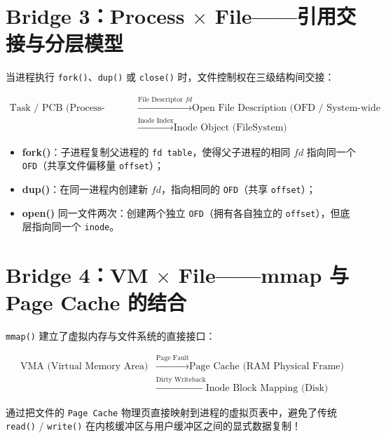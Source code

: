 \documentclass[11pt,a4paper]{ctexart}
\newcommand{\kw}[1]{\textbf{#1}}
\newcommand{\code}[1]{\texttt{#1}}
\begin{document}
\section{Bridge 3：Process $\times$ File——引用交接与分层模型}

当进程执行 \code{fork()}、\code{dup()} 或 \code{close()} 时，文件控制权在三级结构间交接：

\[
\boxed{
\begin{aligned}
\text{Task / PCB (Process-private Table)}
&\xrightarrow{\text{File Descriptor } fd} \text{Open File Description (OFD / System-wide Table)} \\
&\xrightarrow{\text{Inode Index}} \text{Inode Object (FileSystem)}
\end{aligned}
}
\]

\begin{itemize}
  \item \kw{fork()}：子进程复制父进程的 \code{fd table}，使得父子进程的相同 $fd$ 指向同一个 \code{OFD}（共享文件偏移量 \code{offset}）；
  \item \kw{dup()}：在同一进程内创建新 $fd$，指向相同的 \code{OFD}（共享 \code{offset}）；
  \item \kw{open()} 同一文件两次：创建两个独立 \code{OFD}（拥有各自独立的 \code{offset}），但底层指向同一个 \code{inode}。
\end{itemize}

\section{Bridge 4：VM $\times$ File——mmap 与 Page Cache 的结合}

\code{mmap()} 建立了虚拟内存与文件系统的直接接口：

\[
\boxed{
\begin{aligned}
\text{VMA (Virtual Memory Area)}
&\xrightarrow{\text{Page Fault}} \text{Page Cache (RAM Physical Frame)} \\
&\xrightarrow{\text{Dirty Writeback}} \text{Inode Block Mapping (Disk)}
\end{aligned}
}
\]

通过把文件的 \code{Page Cache} 物理页直接映射到进程的虚拟页表中，避免了传统 \code{read()} / \code{write()} 在内核缓冲区与用户缓冲区之间的显式数据复制！
\end{document}
